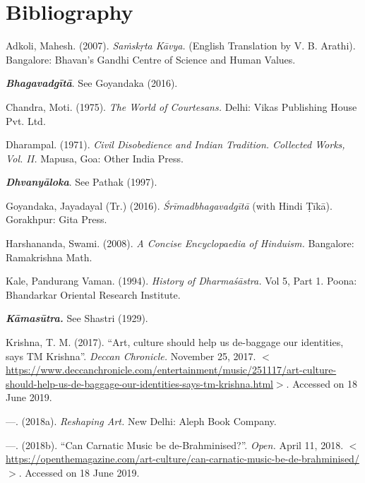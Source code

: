 \vspace{-.3cm}

\section*{Bibliography}

\begin{thebibliography}{99}
\itemsep=0pt

  Adkoli, Mahesh. (2007). \textit{Saṁskṛta Kāvya.} (English Translation by V. B. Arathi). Bangalore: Bhavan’s Gandhi Centre of Science and Human Values.

  \textit{\textbf{Bhagavadgītā}}. See Goyandaka (2016).

  Chandra, Moti. (1975). \textit{The World of Courtesans.} Delhi: Vikas Publishing House Pvt. Ltd.

  Dharampal. (1971). \textit{Civil Disobedience and Indian Tradition. Collected Works, Vol. II.} Mapusa, Goa: Other India Press.

  \textit{\textbf{Dhvanyāloka}}. See Pathak (1997).

  Goyandaka, Jayadayal (Tr.) (2016). \textit{Śrīmadbhagavadgītā} (with Hindi Ṭīkā). Gorakhpur: Gita Press.

  Harshananda, Swami. (2008). \textit{A Concise Encyclopaedia of Hinduism.} Bangalore: Ramakrishna Math.

  Kale, Pandurang Vaman. (1994). \textit{History of Dharmaśāstra.} Vol 5, Part 1. Poona: Bhandarkar Oriental Research Institute.

  \textit{\textbf{Kāmasūtra.}} See Shastri (1929).

  Krishna, T. M. (2017). “Art, culture should help us de-baggage our identities, says TM Krishna”. \textit{Deccan Chronicle.} November 25, 2017. $<$\url{https://www.deccanchronicle.com/entertainment/music/251117/art-culture-should-help-us-de-baggage-our-identities-says-tm-krishna.html}$>$. Accessed on 18 June 2019.

  —. (2018a). \textit{Reshaping Art.} New Delhi: Aleph Book Company.

  —. (2018b). “Can Carnatic Music be de-Brahminised?”. \textit{Open.} April 11, 2018. $<$\url{https://openthemagazine.com/art-culture/can-carnatic-music-be-de-brahminised/}$>$. Accessed on 18 June 2019.


\end{thebibliography}
